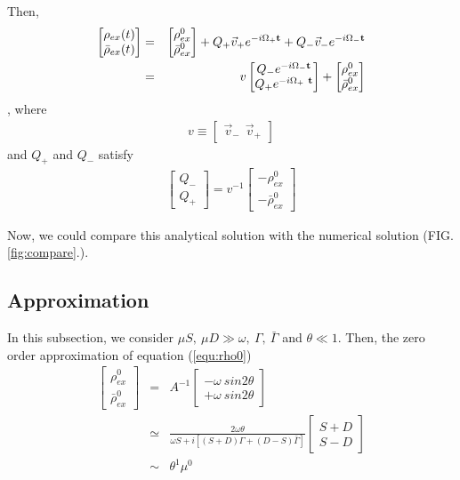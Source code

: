 \documentclass[aps,prd,twocolumn,amsmath,amssymb,groupedaddress]{revtex4-2}
\begin{document}
Then,
\begin{eqnarray}
\begin{bmatrix}
	\rho_{ex} (t)\\ \bar{\rho}_{ex} (t)
\end{bmatrix}
&=& \begin{bmatrix} 
	\rho^0_{ex} \\ \bar{\rho}^0_{ex}
\end{bmatrix} + 
Q_+ \vec{v}_+
e^{-i \Omega_{+} \bf{t}} +
Q_- \vec{v}_-
e^{-i \Omega_{-} \bf{t}} \nonumber \\
&=&
v
\begin{bmatrix}
	Q_-e^{-i \Omega_{-} \bf{t}} \\ Q_+e^{-i \Omega_{+} ~\bf{t}}
\end{bmatrix} + 
\begin{bmatrix} 
	\rho^0_{ex} \\ \bar{\rho}^0_{ex}
\end{bmatrix}
\end{eqnarray}
, where 
\begin{eqnarray}
v \equiv
\begin{bmatrix}
	\vec{v}_- ~~ \vec{v}_+
\end{bmatrix}
\end{eqnarray}
and $Q_+$ and $Q_-$ satisfy
\begin{eqnarray}
\label{equ:Q}
\begin{bmatrix}
	Q_- \\ Q_+
\end{bmatrix} =
v^{-1}
\begin{bmatrix}
	- \rho^0_{ex} \\ -\bar{\rho}^0_{ex}
\end{bmatrix}
\end{eqnarray}

Now, we could compare this analytical solution with the numerical solution (FIG. \ref{fig:compare}.).


\subsection{\label{subsec:approximation} Approximation}
In this subsection, we consider $\mu S, ~\mu D \gg \omega, ~\Gamma, ~\bar{\Gamma} $ and $\theta \ll 1$. Then, the zero order approximation of equation (\ref{equ:rho0}) 
\begin{eqnarray}
	\begin{bmatrix} 
		\rho^0_{ex} \\ \bar{\rho}^0_{ex}
	\end{bmatrix} 
	&=& A^{-1} 
	\begin{bmatrix}
		-\omega ~sin2\theta \\ + \omega ~sin2\theta
	\end{bmatrix} \nonumber \\
	\label{equ:0_rho0}
	&\simeq&
	\frac{2\omega \theta}{\omega S + i\left[(S+D) \Gamma + (D-S) \bar{\Gamma}\right]}
	\begin{bmatrix}
		S+D \\ S-D
	\end{bmatrix} \\
	&\sim& \theta^1 \mu^0
\end{eqnarray}
\end{document}
